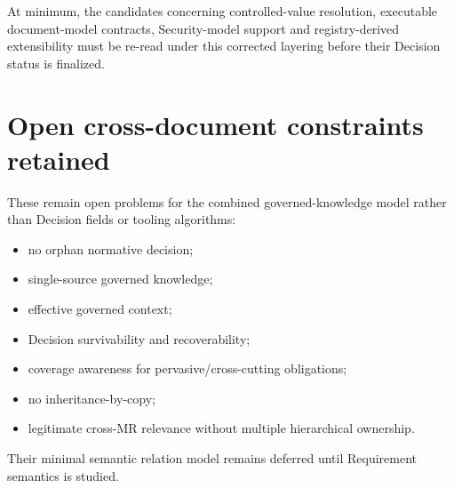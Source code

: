 \documentclass[11pt,a4paper]{article}
\begin{document}
At minimum, the candidates concerning controlled-value resolution, executable document-model contracts, Security-model support and registry-derived extensibility must be re-read under this corrected layering before their Decision status is finalized.

\section{Open cross-document constraints retained}
These remain open problems for the combined governed-knowledge model rather than Decision fields or tooling algorithms:
\begin{itemize}
\item no orphan normative decision;
\item single-source governed knowledge;
\item effective governed context;
\item Decision survivability and recoverability;
\item coverage awareness for pervasive/cross-cutting obligations;
\item no inheritance-by-copy;
\item legitimate cross-MR relevance without multiple hierarchical ownership.
\end{itemize}
Their minimal semantic relation model remains deferred until Requirement semantics is studied.
\end{document}
